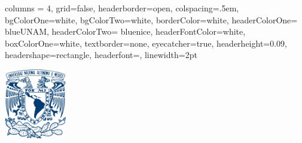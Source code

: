 \documentclass[a0paper,portrait]{baposter}
\begin{document}
	\background{ }
	\begin{poster}{
			columns = 4, 
			grid=false,
			headerborder=open, %
			colspacing=.5em, %
			bgColorOne=white, %
			bgColorTwo=white, %
			borderColor=white,%
			headerColorOne= blueUNAM, %
			headerColorTwo= bluenice, %
			headerFontColor=white,%
			boxColorOne=white, %
			textborder=none, %
			eyecatcher=true, %
			headerheight=0.09\textheight, %
			headershape=rectangle, %
			headerfont=\Large, %
			linewidth=2pt %
		}
		{\includegraphics[width=2.7cm]{logo_unam}
			
}
\end{poster}
\end{document}
